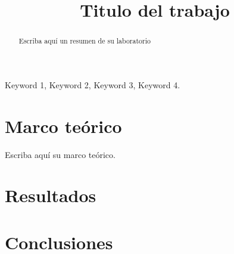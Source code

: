 \documentclass[conference,compsoc,onecolumn]{IEEEtran}
\begin{document}
\title{Titulo del trabajo}
\author{
}


\maketitle
\IEEEoverridecommandlockouts
\IEEEpeerreviewmaketitle

\begin{abstract}
Escriba aquí un resumen de su laboratorio
\end{abstract}


\begin{IEEEkeywords}
    Keyword 1, Keyword 2, Keyword 3, Keyword 4.
\end{IEEEkeywords}


\section{Marco teórico}
\label{sec:introduction}
Escriba aquí su marco teórico.


\section{Resultados}
\label{sec:results}

\section{Conclusiones}
\label{sec:conclusions}


\nocite{*}

\label{sec:biblio}
% 





\end{document}
